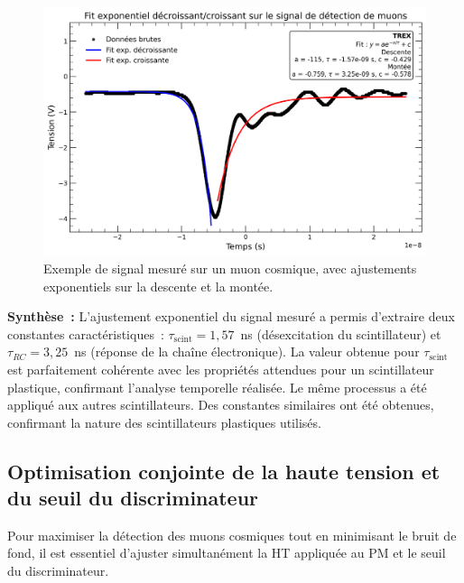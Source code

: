 \documentclass[a4paper,12pt,twoside]{article}
\begin{document}
\begin{figure}[H]
    \centering
    \includegraphics[width=1\textwidth]{Images/Desexitation_Scintillateur_2.png}
    \caption{Exemple de signal mesuré sur un muon cosmique, avec ajustements exponentiels sur la descente et la montée.}
    \label{fig:signal-muon}
\end{figure}

\begin{remarque}
\textbf{Synthèse~:} L’ajustement exponentiel du signal mesuré a permis d’extraire deux constantes caractéristiques~: $\tau_{\text{scint}} = 1{,}57$~ns (désexcitation du scintillateur) et $\tau_{RC} = 3{,}25$~ns (réponse de la chaîne électronique). La valeur obtenue pour $\tau_{\text{scint}}$ est parfaitement cohérente avec les propriétés attendues pour un scintillateur plastique, confirmant l’analyse temporelle réalisée.
Le même processus a été appliqué aux autres scintillateurs. Des constantes similaires ont été obtenues, confirmant la nature des scintillateurs plastiques utilisés.
\end{remarque}

\newpage

\subsection{Optimisation conjointe de la haute tension et du seuil du discriminateur}


\vspace{1em}
\begin{center}
\begin{tcolorbox}[colback=blue!5!white, colframe=blue!60!black, title=Optimisation conjointe des réglages électroniques]
Pour maximiser la détection des muons cosmiques tout en minimisant le bruit de fond, il est essentiel d’ajuster simultanément la HT appliquée au PM et le seuil du discriminateur.
\end{tcolorbox}
\end{center}
\end{document}
